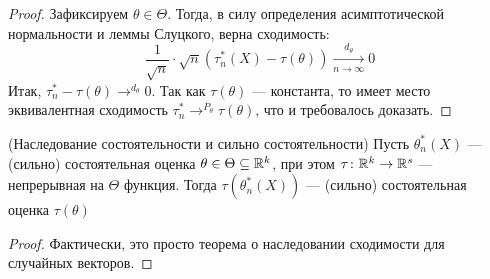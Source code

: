 \begin{proof}
	Зафиксируем $\theta \in \Theta$. Тогда, в силу определения асимптотической нормальности и леммы Слуцкого, верна сходимость:
	\[
		\frac{1}{\sqrt{n}} \cdot \sqrt{n}(\tau_n^*(X) - \tau(\theta)) \xrightarrow[n \to \infty]{d_\theta} 0
	\]
	Итак, $\tau_n^* - \tau(\theta) \to^{d_\theta} 0$. Так как $\tau(\theta)$ --- константа, то имеет место эквивалентная сходимость $\tau_n^* \to^{P_\theta} \tau(\theta)$, что и требовалось доказать.
\end{proof}

\begin{proposition} (Наследование состоятельности и сильно состоятельности)
	Пусть $\theta_n^*(X)$ --- (сильно) состоятельная оценка $\theta \in \Theta \subseteq \mathbb{R}^k$, при этом $\tau \colon \mathbb{R}^k \to \mathbb{R}^s$ --- непрерывная на $\Theta$ функция. Тогда $\tau(\theta_n^*(X))$ --- (сильно) состоятельная оценка $\tau(\theta)$
\end{proposition}

\begin{proof}
	Фактически, это просто теорема о наследовании сходимости для случайных векторов.
\end{proof}